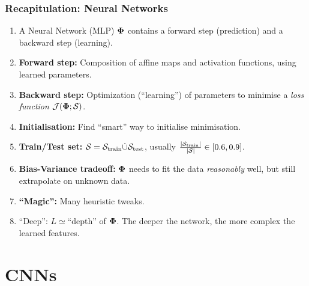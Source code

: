 \documentclass[10pt,hyperref={pdfpagelabels=false}]{beamer}
\begin{document}
\begin{frame}
    \frametitle{Recapitulation: Neural Networks}
    \begin{enumerate}
        \item A Neural Network (MLP) $\boldsymbol{\Phi}$ contains a forward step (prediction) and a backward step (learning).
        \item {\bf Forward step:} Composition of affine maps and activation functions, using learned parameters.
        \item {\bf Backward step:} Optimization (``learning'') of parameters to minimise a \emph{loss function} $\mathcal{J}(\boldsymbol{\Phi}; \mathcal{S})$.
        \item {\bf Initialisation:} Find ``smart'' way to initialise minimisation.
        \item {\bf Train/Test set:} $\mathcal{S}=\mathcal{S}_{\text{train}}\dot{\cup} \mathcal{S}_{\text{test}}$, usually $\frac{\left|\dataset_{\text{train}}\right|}{\left|\dataset\right|} \in [0.6, 0.9]$.
        \item {\bf Bias-Variance tradeoff:} $\boldsymbol{\Phi}$ needs to fit the data \emph{reasonably} well, but still extrapolate on unknown data.
        \item {\bf ``Magic'':} Many heuristic tweaks.
        \item ``Deep'': $L\simeq$``depth'' of $\boldsymbol{\Phi}$. The deeper the network, the more complex the learned features.
    \end{enumerate}
\end{frame}
\section{CNNs}
\end{document}

